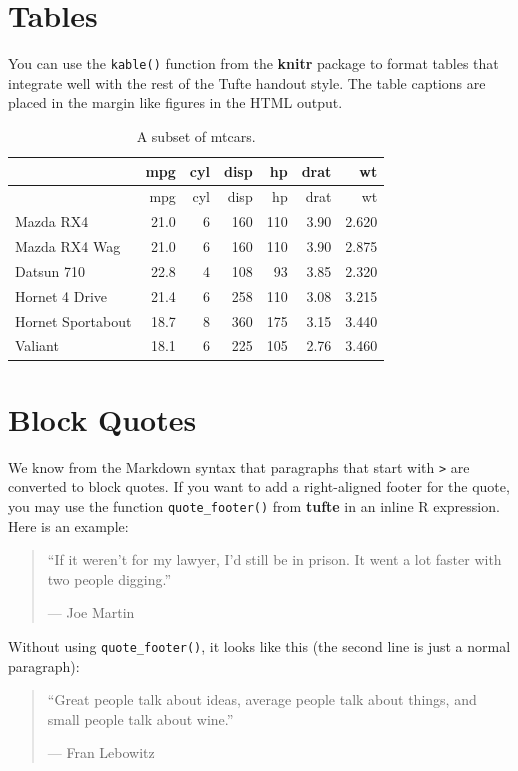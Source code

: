 \documentclass[]{tufte-book}
\begin{document}
\hypertarget{tables}{%
\chapter{Tables}\label{tables}}

You can use the \texttt{kable()} function from the \textbf{knitr}
package to format tables that integrate well with the rest of the Tufte
handout style. The table captions are placed in the margin like figures
in the HTML output.

\begin{longtable}[]{@{}lrrrrrr@{}}
\caption{A subset of mtcars.}\tabularnewline
\toprule
& mpg & cyl & disp & hp & drat & wt\tabularnewline
\midrule
\endfirsthead
\toprule
& mpg & cyl & disp & hp & drat & wt\tabularnewline
\midrule
\endhead
Mazda RX4 & 21.0 & 6 & 160 & 110 & 3.90 & 2.620\tabularnewline
Mazda RX4 Wag & 21.0 & 6 & 160 & 110 & 3.90 & 2.875\tabularnewline
Datsun 710 & 22.8 & 4 & 108 & 93 & 3.85 & 2.320\tabularnewline
Hornet 4 Drive & 21.4 & 6 & 258 & 110 & 3.08 & 3.215\tabularnewline
Hornet Sportabout & 18.7 & 8 & 360 & 175 & 3.15 & 3.440\tabularnewline
Valiant & 18.1 & 6 & 225 & 105 & 2.76 & 3.460\tabularnewline
\bottomrule
\end{longtable}

\hypertarget{block-quotes}{%
\chapter{Block Quotes}\label{block-quotes}}

We know from the Markdown syntax that paragraphs that start with
\texttt{\textgreater{}} are converted to block quotes. If you want to
add a right-aligned footer for the quote, you may use the function
\texttt{quote\_footer()} from \textbf{tufte} in an inline R expression.
Here is an example:

\begin{quote}
``If it weren't for my lawyer, I'd still be in prison. It went a lot
faster with two people digging.''

\hfill --- Joe Martin
\end{quote}

Without using \texttt{quote\_footer()}, it looks like this (the second
line is just a normal paragraph):

\begin{quote}
``Great people talk about ideas, average people talk about things, and
small people talk about wine.''

--- Fran Lebowitz
\end{quote}
\end{document}
